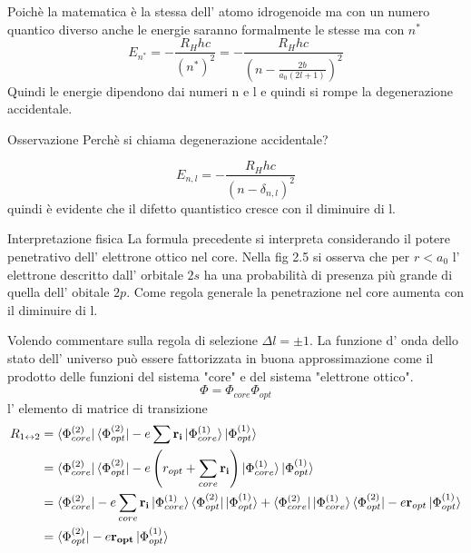 \documentclass[11pt,a4paper]{article}
\theoremstyle{springer}
\theoremstyle{definition}
\theoremstyle{remark}
\begin{document}
Poichè la matematica è la stessa dell' atomo idrogenoide ma con un numero quantico diverso anche le energie saranno formalmente le stesse ma con $n^*$
\begin{equation*}
  E_{n^*} = -\frac{R_Hhc}{(n^*)^2} = -\frac{R_Hhc}{(n-\frac{2b}{a_0(2l+1)})^2}
\end{equation*}
Quindi le energie dipendono dai numeri n e l e quindi si rompe la degenerazione accidentale.
\begin{notebox}{Osservazione}
  Perchè si chiama degenerazione accidentale?
\end{notebox}
\begin{equation*}
E_{n,l} = -\frac{R_H hc}{(n-\delta_{n,l})^2}
\end{equation*}
quindi è evidente che il difetto quantistico cresce con il diminuire di l.
\begin{greenbox}{Interpretazione fisica}
 La formula precedente si interpreta considerando il potere penetrativo dell' elettrone ottico nel core. Nella fig 2.5 si osserva che per $r< a_0$ l' elettrone descritto dall' orbitale $2s$ ha una probabilità di presenza più grande di quella dell' obitale $2p$. Come regola generale la penetrazione nel core aumenta con il diminuire di l.
\end{greenbox}
Volendo commentare sulla regola di selezione $\Delta l = \pm 1 $.  La funzione d' onda dello stato dell' universo può essere fattorizzata in buona approssimazione come il prodotto delle funzioni del sistema "core" e del sistema "elettrone ottico".
\begin{equation*}
  \Phi = \Phi_{core} \Phi_{opt}
\end{equation*}
l' elemento di matrice di transizione 
\begin{align*}
  R_{1\leftrightarrow2} &= \bra{\Phi_{core}^{(2)}}\bra{\Phi_{opt}^{(2)}} -e \sum \mathbf{r_i}\ket{\Phi_{core}^{(1)}}\ket{\Phi_{opt}^{(1)}} \\
&= \bra{\Phi_{core}^{(2)}}\bra{\Phi_{opt}^{(2)}} -e\left( r_{opt}+ \sum_{core}\mathbf{r_i}\right)\ket{\Phi_{core}^{(1)}}\ket{\Phi_{opt}^{(1)}}\\
&= \bra{\Phi_{core}^{(2)}} -e\sum_{core}\mathbf{r_i}\ket{\Phi_{core}^{(1)}}\bra{\Phi_{opt}^{(2)}}\ket{\Phi_{opt}^{(1)}} +  \bra{\Phi_{core}^{(2)}} \ket{\Phi_{core}^{(1)}}\bra{\Phi_{opt}^{(2)}}-e \mathbf{r}_{opt}\ket{\Phi_{opt}^{(1)}} \\
&= \bra{\Phi_{opt}^{(2)}} -e \mathbf{r_{opt}} \ket{\Phi_{opt}^{(1)}}
\end{align*}
\end{document}
